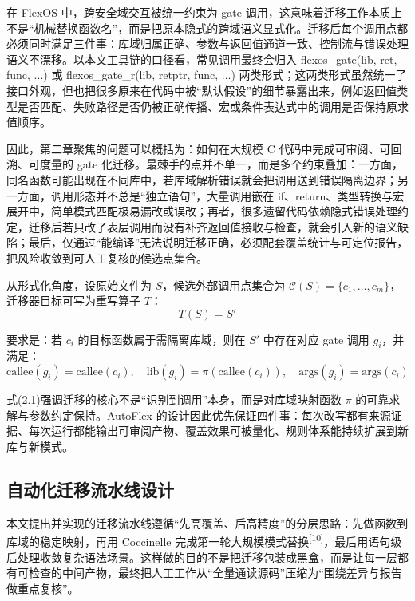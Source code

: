 \documentclass[UTF8,a4paper,12pt,twoside]{ctexart}  %
\begin{document}
在 FlexOS 中，跨安全域交互被统一约束为 gate
调用，这意味着迁移工作本质上不是``机械替换函数名''，而是把原本隐式的跨域语义显式化。迁移后每个调用点都必须同时满足三件事：库域归属正确、参数与返回值通道一致、控制流与错误处理语义不漂移。以本文工具链的口径看，常见调用最终会归入
flexos\_gate(lib, ret, func, ...) 或 flexos\_gate\_r(lib, retptr, func,
...)
两类形式；这两类形式虽然统一了接口外观，但也把很多原来在代码中被``默认假设''的细节暴露出来，例如返回值类型是否匹配、失败路径是否仍被正确传播、宏或条件表达式中的调用是否保持原求值顺序。

因此，第二章聚焦的问题可以概括为：如何在大规模 C
代码中完成可审阅、可回溯、可度量的 gate
化迁移。最棘手的点并不单一，而是多个约束叠加：一方面，同名函数可能出现在不同库中，若库域解析错误就会把调用送到错误隔离边界；另一方面，调用形态并不总是``独立语句''，大量调用嵌在
if、return、类型转换与宏展开中，简单模式匹配极易漏改或误改；再者，很多遗留代码依赖隐式错误处理约定，迁移后若只改了表层调用而没有补齐返回值接收与检查，就会引入新的语义缺陷；最后，仅通过``能编译''无法说明迁移正确，必须配套覆盖统计与可定位报告，把风险收敛到可人工复核的候选点集合。

从形式化角度，设原始文件为 \(S\)，候选外部调用点集合为
\(\mathcal{C}(S)=\{c_1,\dots,c_m\}\)，迁移器目标可写为重写算子 \(T\)：
\begin{equation}
T(S) = S' 
\end{equation}

要求是：若 \(c_i\) 的目标函数属于需隔离库域，则在 \(S'\) 中存在对应 gate
调用 \(g_i\)，并满足：
\begin{equation}
\text{callee}(g_i)=\text{callee}(c_i),\quad \text{lib}(g_i)=\pi(\text{callee}(c_i)),\quad \text{args}(g_i)=\text{args}(c_i)
\end{equation}

式(2.1)强调迁移的核心不是``识别到调用''本身，而是对库域映射函数 \(\pi\)
的可靠求解与参数约定保持。AutoFlex
的设计因此优先保证四件事：每次改写都有来源证据、每次运行都能输出可审阅产物、覆盖效果可被量化、规则体系能持续扩展到新库与新模式。

\subsection{自动化迁移流水线设计}

本文提出并实现的迁移流水线遵循``先高覆盖、后高精度''的分层思路：先做函数到库域的稳定映射，再用
Coccinelle
完成第一轮大规模模式替换\textsuperscript{[10]}，最后用语句级后处理收敛复杂语法场景。这样做的目的不是把迁移包装成黑盒，而是让每一层都有可检查的中间产物，最终把人工工作从``全量通读源码''压缩为``围绕差异与报告做重点复核''。
\end{document}
